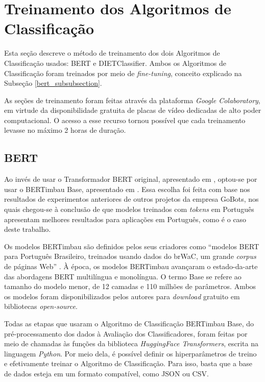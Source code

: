 \section{Treinamento dos Algoritmos de Classificação}
\label{algoritmos_classificacao}
Esta seção descreve o método de treinamento dos dois Algoritmos de Classificação usados: BERT e DIETClassifier. Ambos os Algoritmos de Classificação foram treinados por meio de \textit{fine-tuning}, conceito explicado na Subseção \ref{bert_subsubsection}.

As seções de treinamento foram feitas através da plataforma \textit{Google Colaboratory}, em virtude da disponibilidade gratuita de placas de vídeo dedicadas de alto poder computacional. O acesso a esse recurso tornou possível que cada treinamento levasse no máximo 2 horas de duração.

\subsection{BERT}
\label{des_treinamento_hf}
Ao invés de usar o Transformador BERT original, apresentado em , optou-se por usar o BERTimbau Base, apresentado em . Essa escolha foi feita com base nos resultados de experimentos anteriores de outros projetos da empresa GoBots, nos quais chegou-se à conclusão de que modelos treinados com \textit{tokens} em Português apresentam melhores resultados para aplicações em Português, como é o caso deste trabalho.

Os modelos BERTimbau são definidos pelos seus criadores como ``modelos BERT para Português Brasileiro, treinados usando dados do brWaC, um grande \textit{corpus} de páginas Web'' \cite{bertimbau}. À época, os modelos BERTimbau avançaram o estado-da-arte das abordagens BERT multilíngua e monolíngua. O termo Base se refere ao tamanho do modelo menor, de 12 camadas e 110 milhões de parâmetros. Ambos os modelos foram disponibilizados pelos autores para \textit{download} gratuito em bibliotecas \textit{open-source}.

Todas as etapas que usaram o Algoritmo de Classificação BERTimbau Base, do pré-processamento dos dados à Avaliação dos Classificadores, foram feitas por meio de chamadas às funções da biblioteca \textit{HuggingFace Transformers}, escrita na linguagem \textit{Python}. Por meio dela, é possível definir os hiperparâmetros de treino e efetivamente treinar o Algoritmo de Classificação. Para isso, basta que a base de dados esteja em um formato compatível, como JSON ou CSV.

